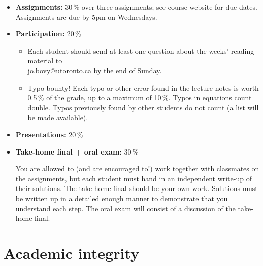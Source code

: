 \documentclass{article}
\begin{document}
\begin{itemize}

    \item {\bf Assignments:} 30\,\% over three assignments; see course website for due dates. Assignments are due by 5pm on Wednesdays.

    \item {\bf Participation:} 20\,\%
    \begin{itemize}
        \item Each student should send at least one question about the
          weeks' reading material to\\
          \href{mailto:jo.bovy@utoronto.ca}{jo.bovy@utoronto.ca} by the
          end of Sunday.
        \item Typo bounty! Each typo or other error found in the lecture notes is worth 0.5\,\% of the grade, up to a maximum of 10\,\%. Typos in equations count double. Typos previously found by other students do not count (a list will be made available).
      \end{itemize}
  
    \item {\bf Presentations:} 20\,\%
  
    \item {\bf Take-home final + oral exam:} 30\,\%
  
  You are allowed to (and are encouraged to!) work together with
  classmates on the assignments, but each student must hand in an
  independent write-up of their solutions. The take-home final should be
  your own work. Solutions must be written up in a detailed enough
  manner to demonstrate that you understand each step. The oral exam
  will consist of a discussion of the take-home final. 

\end{itemize}

\section*{Academic integrity}
\end{document}
